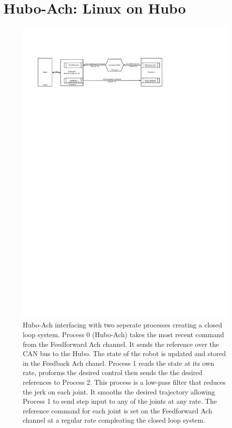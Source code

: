 \section{Hubo-Ach: Linux on Hubo}

\begin{figure}[thpb]
  \centering
\includegraphics[width=2.0\columnwidth]{./pix/hubo-ach-diagram-example.pdf}
  \caption{Hubo-Ach interfacing with two seperate processes creating a closed loop system.  Process 0 (Hubo-Ach) takes the most recent command from the Feedforward Ach channel.
  It sends the reference over the CAN bus to the Hubo.  
  The state of the robot is updated and stored in the Feedback Ach chanel.  
  Process 1 reads the state at its own rate, proforms the desired control then sends the the desired references to Process 2.  
This process is a low-pass filter that reduces the jerk on each joint.  
It smooths the desired trajectory allowing Process 1 to send step input to any of the joints at any rate. 
The reference command for each joint is set on the Feedforward Ach channel at a regular rate compleating the closed loop system.}
  \label{fig:graph}
\end{figure}


